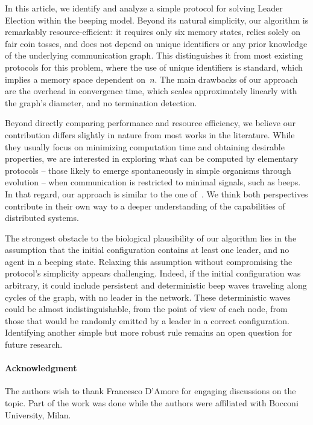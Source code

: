 \documentclass{article}
\begin{document}
In this article, we identify and analyze a simple protocol for solving Leader Election within the beeping model.
Beyond its natural simplicity, our algorithm is remarkably resource-efficient: it requires only six memory states, relies solely on fair coin tosses, and does not depend on unique identifiers or any prior knowledge of the underlying communication graph. This distinguishes it from most existing protocols for this problem, where the use of unique identifiers is standard, which implies a memory space dependent on~$n$.
The main drawbacks of our approach are the overhead in convergence time, which scales approximately linearly with the graph’s diameter, and no termination detection.

Beyond directly comparing performance and resource efficiency, we believe our contribution differs slightly in nature from most works in the literature. While they usually focus on minimizing computation time and obtaining desirable properties, we are interested in exploring what can be computed by elementary protocols -- those likely to emerge spontaneously in simple organisms through evolution -- when communication is restricted to minimal signals, such as beeps. In that regard, our approach is similar to the one of~\cite{gilbert_computational_2015}. We think both perspectives contribute in their own way to a deeper understanding of the capabilities of distributed systems.

The strongest obstacle to the biological plausibility of our algorithm lies in the assumption that the initial configuration contains at least one leader, and no agent in a beeping state. Relaxing this assumption without compromising the protocol’s simplicity appears challenging. Indeed, if the initial configuration was arbitrary, it could include persistent and deterministic beep waves traveling along cycles of the graph, with no leader in the network. These deterministic waves could be almost indistinguishable, from the point of view of each node, from those that would be randomly emitted by a leader in a correct configuration.
Identifying another simple but more robust rule remains an open question for future research.

\paragraph{Acknowledgment}
The authors wish to thank Francesco D'Amore for engaging discussions on the topic.
Part of the work was done while the authors were affiliated with Bocconi University, Milan.
\end{document}
